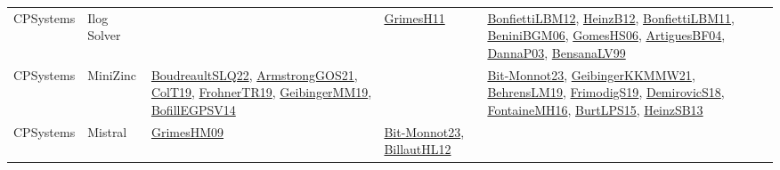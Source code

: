 {\begin{longtable}{lp{3cm}>{\raggedright}p{6cm}>{\raggedright}p{6cm}p{8cm}}
CPSystems & Ilog Solver &  & \href{papers/GrimesH11.pdf}{GrimesH11}\cite{GrimesH11} & \href{papers/BonfiettiLBM12.pdf}{BonfiettiLBM12}\cite{BonfiettiLBM12}, \href{papers/HeinzB12.pdf}{HeinzB12}\cite{HeinzB12}, \href{papers/BonfiettiLBM11.pdf}{BonfiettiLBM11}\cite{BonfiettiLBM11}, \href{papers/BeniniBGM06.pdf}{BeniniBGM06}\cite{BeniniBGM06}, \href{papers/GomesHS06.pdf}{GomesHS06}\cite{GomesHS06}, \href{papers/ArtiguesBF04.pdf}{ArtiguesBF04}\cite{ArtiguesBF04}, \href{papers/DannaP03.pdf}{DannaP03}\cite{DannaP03}, \href{articles/BensanaLV99.pdf}{BensanaLV99}\cite{BensanaLV99}\\
CPSystems & MiniZinc & \href{papers/BoudreaultSLQ22.pdf}{BoudreaultSLQ22}\cite{BoudreaultSLQ22}, \href{papers/ArmstrongGOS21.pdf}{ArmstrongGOS21}\cite{ArmstrongGOS21}, \href{papers/ColT19.pdf}{ColT19}\cite{ColT19}, \href{papers/FrohnerTR19.pdf}{FrohnerTR19}\cite{FrohnerTR19}, \href{papers/GeibingerMM19.pdf}{GeibingerMM19}\cite{GeibingerMM19}, \href{papers/BofillEGPSV14.pdf}{BofillEGPSV14}\cite{BofillEGPSV14} &  & \href{papers/Bit-Monnot23.pdf}{Bit-Monnot23}\cite{Bit-Monnot23}, \href{papers/GeibingerKKMMW21.pdf}{GeibingerKKMMW21}\cite{GeibingerKKMMW21}, \href{papers/BehrensLM19.pdf}{BehrensLM19}\cite{BehrensLM19}, \href{papers/FrimodigS19.pdf}{FrimodigS19}\cite{FrimodigS19}, \href{papers/DemirovicS18.pdf}{DemirovicS18}\cite{DemirovicS18}, \href{papers/FontaineMH16.pdf}{FontaineMH16}\cite{FontaineMH16}, \href{papers/BurtLPS15.pdf}{BurtLPS15}\cite{BurtLPS15}, \href{articles/HeinzSB13.pdf}{HeinzSB13}\cite{HeinzSB13}\\
CPSystems & Mistral & \href{papers/GrimesHM09.pdf}{GrimesHM09}\cite{GrimesHM09} & \href{papers/Bit-Monnot23.pdf}{Bit-Monnot23}\cite{Bit-Monnot23}, \href{papers/BillautHL12.pdf}{BillautHL12}\cite{BillautHL12} & \\

\end{longtable}}
